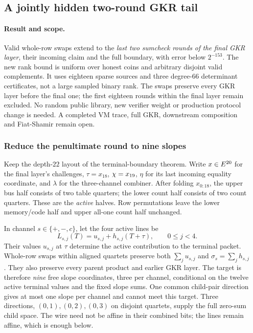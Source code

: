\subsection{A jointly hidden two-round GKR tail}\label{note:zk-penultimate-round}

\paragraph{Result and scope.} Valid whole-row swaps extend  to the \emph{last two sumcheck rounds of the final GKR layer}, their incoming claim and the full boundary, with error below $2^{-153}$. The new rank bound is uniform over honest coins and arbitrary disjoint valid complements. It uses eighteen sparse sources and three degree-$66$ determinant certificates, not a large sampled binary rank. The swaps preserve every GKR layer before the final one; the first eighteen rounds within the final layer remain excluded. No random public library, new verifier weight or production protocol change is needed. A completed VM trace, full GKR, downstream composition and Fiat-Shamir remain open.

\subsubsection{Reduce the penultimate round to nine slopes}

Keep the depth-$22$ layout of the terminal-boundary theorem. Write $x\in E^{20}$ for the final layer's challenges, $\tau=x_{18}$, $\chi=x_{19}$, $\eta$ for its last incoming equality coordinate, and $\lambda$ for the three-channel combiner. After folding $x_{0:18}$, the upper bus half consists of two table quarters; the lower count half consists of two count quarters. These are the \emph{active} halves. Row permutations leave the lower memory/code half and upper all-one count half unchanged.

In channel $s\in\{+,-,c\}$, let the four active lines be
\[
 L_{s,j}(T)=u_{s,j}+h_{s,j}(T+\tau),\qquad 0\le j<4.
\]
Their values $u_{s,j}$ at $\tau$ determine the active contribution to the terminal packet. Whole-row swaps within aligned quartets preserve both $\sum_j u_{s,j}$ and $\sigma_s=\sum_j h_{s,j}$. They also preserve every parent product and earlier GKR layer. The target is therefore \emph{nine} free slope coordinates, three per channel, conditional on the twelve active terminal values and the fixed slope sums. One common child-pair direction gives at most one slope per channel and cannot meet this target. Three directions, $(0,1),(0,2),(0,3)$ on disjoint quartets, supply the full zero-sum child space. The wire need not be affine in their combined bits; the lines remain affine, which is enough below.

